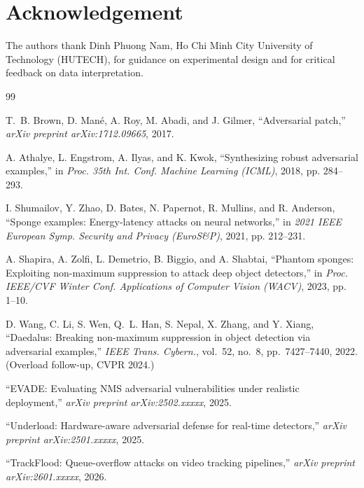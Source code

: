 \documentclass[a4paper,fleqn]{cas-dc}
\begin{document}
\section*{Acknowledgement}
The authors thank Dinh Phuong Nam, Ho Chi Minh City University of Technology (HUTECH), for guidance on experimental design and for critical feedback on data interpretation.

\begin{thebibliography}{99}

 T.~B. Brown, D. Man\'e, A. Roy, M. Abadi, and J. Gilmer, ``Adversarial patch,'' \emph{arXiv preprint arXiv:1712.09665}, 2017.

 A. Athalye, L. Engstrom, A. Ilyas, and K. Kwok, ``Synthesizing robust adversarial examples,'' in \emph{Proc. 35th Int. Conf. Machine Learning (ICML)}, 2018, pp. 284--293.

 I. Shumailov, Y. Zhao, D. Bates, N. Papernot, R. Mullins, and R. Anderson, ``Sponge examples: Energy-latency attacks on neural networks,'' in \emph{2021 IEEE European Symp. Security and Privacy (EuroS\&P)}, 2021, pp. 212--231.

 A. Shapira, A. Zolfi, L. Demetrio, B. Biggio, and A. Shabtai, ``Phantom sponges: Exploiting non-maximum suppression to attack deep object detectors,'' in \emph{Proc. IEEE/CVF Winter Conf. Applications of Computer Vision (WACV)}, 2023, pp. 1--10.

 D. Wang, C. Li, S. Wen, Q.~L. Han, S. Nepal, X. Zhang, and Y. Xiang, ``Daedalus: Breaking non-maximum suppression in object detection via adversarial examples,'' \emph{IEEE Trans. Cybern.}, vol.~52, no.~8, pp.~7427--7440, 2022. (Overload follow-up, CVPR 2024.)

 ``EVADE: Evaluating NMS adversarial vulnerabilities under realistic deployment,'' \emph{arXiv preprint arXiv:2502.xxxxx}, 2025.

 ``Underload: Hardware-aware adversarial defense for real-time detectors,'' \emph{arXiv preprint arXiv:2501.xxxxx}, 2025.

 ``TrackFlood: Queue-overflow attacks on video tracking pipelines,'' \emph{arXiv preprint arXiv:2601.xxxxx}, 2026.


\end{thebibliography}
\end{document}
